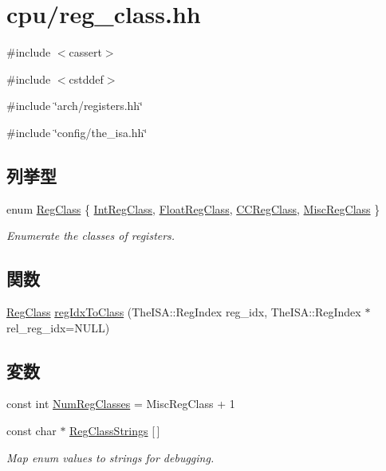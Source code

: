 \hypertarget{reg__class_8hh}{
\section{cpu/reg\_\-class.hh}
\label{reg__class_8hh}
}
{\ttfamily \#include $<$cassert$>$}\par
{\ttfamily \#include $<$cstddef$>$}\par
{\ttfamily \#include \char`\"{}arch/registers.hh\char`\"{}}\par
{\ttfamily \#include \char`\"{}config/the\_\-isa.hh\char`\"{}}\par
\subsection*{列挙型}
\begin{DoxyCompactItemize}
\item 
enum \hyperlink{reg__class_8hh_a3ed1e3c98353f2cc926e9d2b2a527cc0}{RegClass} \{ \hyperlink{reg__class_8hh_a3ed1e3c98353f2cc926e9d2b2a527cc0ab412c1eeaf26e79fee8922d9a479889c}{IntRegClass}, 
\hyperlink{reg__class_8hh_a3ed1e3c98353f2cc926e9d2b2a527cc0a207a831a62a5c23ac4ac6405378b125e}{FloatRegClass}, 
\hyperlink{reg__class_8hh_a3ed1e3c98353f2cc926e9d2b2a527cc0a432484d211463d83c5bd364df83f82c2}{CCRegClass}, 
\hyperlink{reg__class_8hh_a3ed1e3c98353f2cc926e9d2b2a527cc0aed057341e8e2e418632e8a03b42b3f39}{MiscRegClass}
 \}
\begin{DoxyCompactList}\small\item\em Enumerate the classes of registers. \item\end{DoxyCompactList}\end{DoxyCompactItemize}
\subsection*{関数}
\begin{DoxyCompactItemize}
\item 
\hyperlink{reg__class_8hh_a3ed1e3c98353f2cc926e9d2b2a527cc0}{RegClass} \hyperlink{reg__class_8hh_a275a232e420c9ac198b7f942c885ecf8}{regIdxToClass} (TheISA::RegIndex reg\_\-idx, TheISA::RegIndex $\ast$rel\_\-reg\_\-idx=NULL)
\end{DoxyCompactItemize}
\subsection*{変数}
\begin{DoxyCompactItemize}
\item 
const int \hyperlink{reg__class_8hh_a361ac27e5356875b7edf8d5bbe83635a}{NumRegClasses} = MiscRegClass + 1
\item 
const char $\ast$ \hyperlink{reg__class_8hh_abd784c3d8b8c0aa741f47934de24f1fd}{RegClassStrings} \mbox{[}$\,$\mbox{]}
\begin{DoxyCompactList}\small\item\em Map enum values to strings for debugging. \item\end{DoxyCompactList}\end{DoxyCompactItemize}



